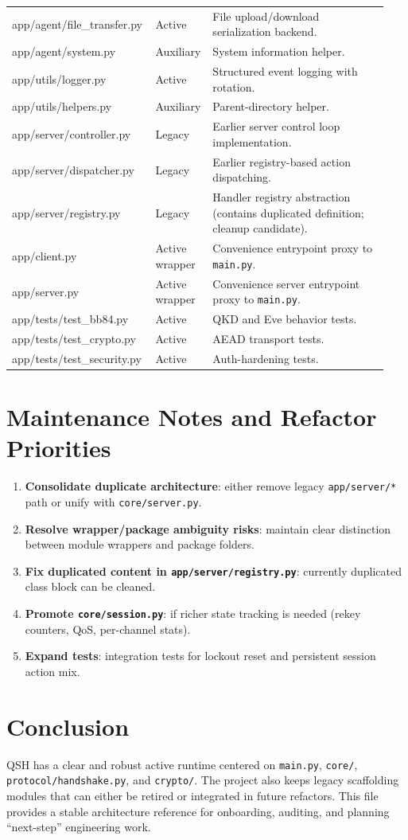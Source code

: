 \documentclass[11pt,a4paper]{article}
\begin{document}
\begin{longtable}{>{\ttfamily}p{0.34\linewidth} p{0.14\linewidth} p{0.46\linewidth}}
app/agent/file\_transfer.py & Active & File upload/download serialization backend. \\
app/agent/system.py & Auxiliary & System information helper. \\
app/utils/logger.py & Active & Structured event logging with rotation. \\
app/utils/helpers.py & Auxiliary & Parent-directory helper. \\
app/server/controller.py & Legacy & Earlier server control loop implementation. \\
app/server/dispatcher.py & Legacy & Earlier registry-based action dispatching. \\
app/server/registry.py & Legacy & Handler registry abstraction (contains duplicated definition; cleanup candidate). \\
app/client.py & Active wrapper & Convenience entrypoint proxy to \texttt{main.py}. \\
app/server.py & Active wrapper & Convenience server entrypoint proxy to \texttt{main.py}. \\
app/tests/test\_bb84.py & Active & QKD and Eve behavior tests. \\
app/tests/test\_crypto.py & Active & AEAD transport tests. \\
app/tests/test\_security.py & Active & Auth-hardening tests. \\
\bottomrule
\end{longtable}

\section{Maintenance Notes and Refactor Priorities}
\begin{enumerate}[leftmargin=1.4em]
  \item \textbf{Consolidate duplicate architecture}: either remove legacy \texttt{app/server/*} path or unify with \texttt{core/server.py}.
  \item \textbf{Resolve wrapper/package ambiguity risks}: maintain clear distinction between module wrappers and package folders.
  \item \textbf{Fix duplicated content in \texttt{app/server/registry.py}}: currently duplicated class block can be cleaned.
  \item \textbf{Promote \texttt{core/session.py}}: if richer state tracking is needed (rekey counters, QoS, per-channel stats).
  \item \textbf{Expand tests}: integration tests for lockout reset and persistent session action mix.
\end{enumerate}

\section{Conclusion}
QSH has a clear and robust active runtime centered on \texttt{main.py}, \texttt{core/}, \texttt{protocol/handshake.py}, and \texttt{crypto/}. The project also keeps legacy scaffolding modules that can either be retired or integrated in future refactors. This file provides a stable architecture reference for onboarding, auditing, and planning ``next-step'' engineering work.
\end{document}
